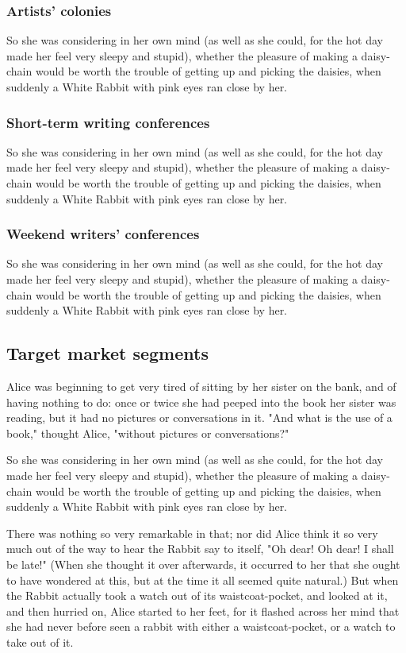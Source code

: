 \documentclass[12pt]{article}
\begin{document}
\subsubsection{Artists' colonies}
\label{sec:orgheadline16}
So she was considering in her own mind (as well as she could, for the hot day made her feel very sleepy and stupid), whether the pleasure of making a daisy-chain would be worth the trouble of getting up and picking the daisies, when suddenly a White Rabbit with pink eyes ran close by her. 

\subsubsection{Short-term writing conferences}
\label{sec:orgheadline17}
So she was considering in her own mind (as well as she could, for the hot day made her feel very sleepy and stupid), whether the pleasure of making a daisy-chain would be worth the trouble of getting up and picking the daisies, when suddenly a White Rabbit with pink eyes ran close by her. 

\subsubsection{Weekend writers' conferences}
\label{sec:orgheadline18}
So she was considering in her own mind (as well as she could, for the hot day made her feel very sleepy and stupid), whether the pleasure of making a daisy-chain would be worth the trouble of getting up and picking the daisies, when suddenly a White Rabbit with pink eyes ran close by her. 

\subsection{Target market segments}
\label{sec:orgheadline23}
Alice was beginning to get very tired of sitting by her sister on the bank, and of having nothing to do: once or twice she had peeped into the book her sister was reading, but it had no pictures or conversations in it. "And what is the use of a book," thought Alice, "without pictures or conversations?" 

So she was considering in her own mind (as well as she could, for the hot day made her feel very sleepy and stupid), whether the pleasure of making a daisy-chain would be worth the trouble of getting up and picking the daisies, when suddenly a White Rabbit with pink eyes ran close by her.

There was nothing so very remarkable in that; nor did Alice think it so very much out of the way to hear the Rabbit say to itself, "Oh dear! Oh dear! I shall be late!" (When she thought it over afterwards, it occurred to her that she ought to have wondered at this, but at the time it all seemed quite natural.) But when the Rabbit actually took a watch out of its waistcoat-pocket, and looked at it, and then hurried on, Alice started to her feet, for it flashed across her mind that she had never before seen a rabbit with either a waistcoat-pocket, or a watch to take out of it. 
\end{document}
